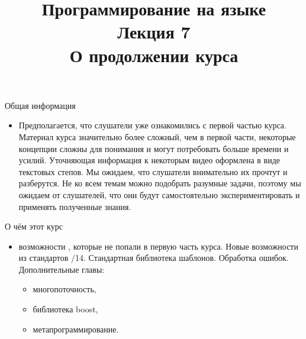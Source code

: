 \documentclass[aspectration=1610,t,12pt]{beamer}
\title{{\bf Программирование на языке \langcpp\protect\\Лекция
7\protect\vspace{1em}\\}О продолжении курса}
\begin{document}
\begin{frame} 
  \titlepage
\end{frame}

\begin{frame}{Общая информация}
    \begin{itemize}
        \item Предполагается, что слушатели уже ознакомились с первой частью курса.
        \pitem Материал курса значительно более сложный, чем в первой части, некоторые концепции сложны для понимания и могут потребовать больше времени и усилий.
        \pitem Уточняющая информация к некоторым видео оформлена в виде текстовых степов. Мы ожидаем, что слушатели внимательно их прочтут и разберутся.
        \pitem Не ко всем темам можно подобрать разумные задачи, поэтому мы ожидаем от слушателей, что они будут самостоятельно экспериментировать и применять полученные знания.
    \end{itemize}
\end{frame}

\begin{frame}{О чём этот курс}{}
\begin{itemize}
	\item {} возможности \langcpp, которые не попали в первую часть курса.
	\pitem Новые возможности из стандартов /14.
	\pitem Стандартная библиотека шаблонов.
	\pitem Обработка ошибок.
	\pitem Дополнительные главы:
	\begin{itemize}
	\item многопоточность, 
	\item библиотека boost, 
	\item метапрограммирование.
	\end{itemize} 
\end{itemize}
\end{frame}
\end{document}

